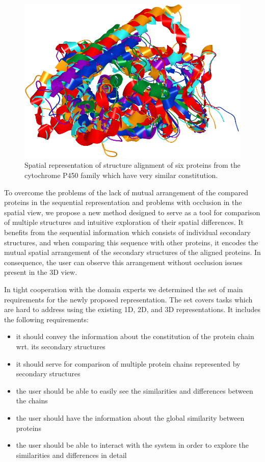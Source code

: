 \documentclass[twocolumn]{bmcart}%
\begin{document}
\begin{figure}[h!]
  \centering
  \includegraphics[width=0.9\columnwidth]{pics/many.png}
  \caption{Spatial representation of structure alignment of six proteins from the cytochrome P450 family which have very similar constitution.}
  \label{fig:many}
\end{figure}

To overcome the problems of the lack of mutual arrangement of the compared proteins in the sequential representation and problems with occlusion in the spatial view, we propose a new method designed to serve as a tool for comparison of multiple structures and intuitive exploration of their spatial differences.
It benefits from the sequential information which consists of individual secondary structures, and when comparing this sequence with other proteins, it encodes the mutual spatial arrangement of the secondary structures of the aligned proteins.
In consequence, the user can observe this arrangement without occlusion issues present in the 3D view.

In tight cooperation with the domain experts we determined the set of main requirements for the newly proposed representation.
The set covers tasks which are hard to address using the existing 1D, 2D, and 3D representations.
It includes the following requirements:
\begin{itemize}
\item it should convey the information about the constitution of the protein chain wrt. its secondary structures
\item it should serve for comparison of multiple protein chains represented by secondary structures
\item the user should be able to easily see the similarities and differences between the chains
\item the user should have the information about the global similarity between proteins 
\item the user should be able to interact with the system in order to explore the similarities and differences in detail
\end{itemize}
\end{document}
